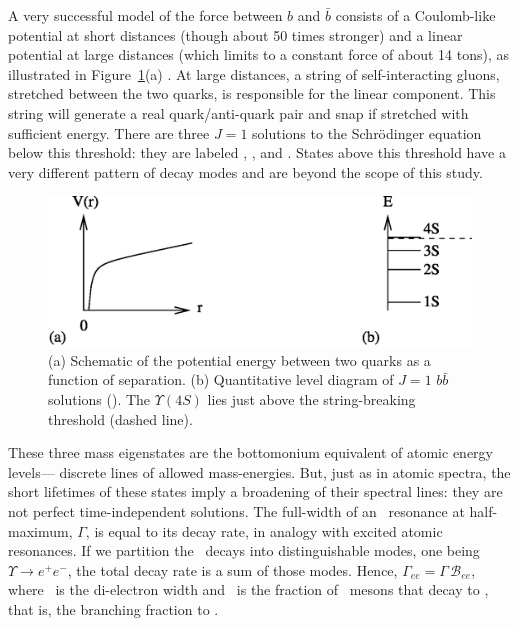 \documentclass{cornell}
\begin{document}
A very successful model of the force between $b$ and $\bar{b}$
consists of a Coulomb-like potential at short distances (though about
50 times stronger) and a linear potential at large distances (which
limits to a constant force of about 14 tons), as illustrated in
Figure~\ref{cornellpotential}(a) \cite{cornellpotential}.  At large
distances, a string of self-interacting gluons, stretched between the
two quarks, is responsible for the linear component.  This string will
generate a real quark/anti-quark pair and snap if stretched with
sufficient energy.  There are three $J=1$ solutions to the
Schr\"odinger equation below this threshold: they are labeled \us,
\uss, and \usss.  States above this threshold have a very different
pattern of decay modes and are beyond the scope of this study.

\begin{figure}[p]
  \begin{center}
    \includegraphics[width=0.8\linewidth]{cornellpotential}
  \end{center}
  \caption[Bottomonium potential and energy
  eigenvalues]{\label{cornellpotential} (a) Schematic of the potential
  energy between two quarks as a function of separation.  (b)
  Quantitative level diagram of $J=1$ $b\bar{b}$ solutions (\ups).
  The $\Upsilon(4S)$ lies just above the string-breaking threshold
  (dashed line).}
\end{figure}

These three mass eigenstates are the bottomonium equivalent of atomic
energy levels--- discrete lines of allowed mass-energies.  But, just
as in atomic spectra, the short lifetimes of these states imply a
broadening of their spectral lines: they are not perfect
time-independent solutions.  The full-width of an \ups\ resonance at
half-maximum, $\Gamma$, is equal to its decay rate, in analogy with
excited atomic resonances.  If we partition the \ups\ decays into
distinguishable modes, one being $\Upsilon \to e^+e^-$, the total
decay rate is a sum of those modes.  Hence, $\Gamma_{ee} = \Gamma \,
{\mathcal B}_{ee}$, where \gee\ is the di-electron width and \bee\ is
the fraction of \ups\ mesons that decay to \ee, that is, the branching
fraction to \ee.
  
\end{document}

